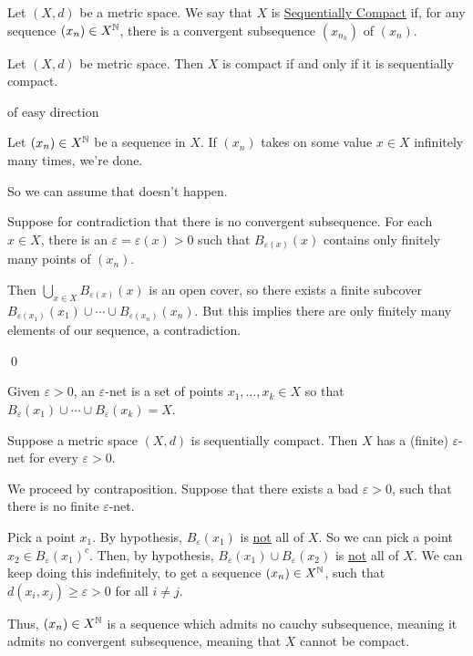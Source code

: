 \documentclass[x11names,reqno,14pt]{extarticle}
\begin{document}

Let $(X, d)$ be a metric space. We say that $X$ is \underline{Sequentially Compact} if, for any sequence $(x_n) \in X^{\mathbb{N}}$, there is a convergent subsequence $(x_{n_k})$ of $(x_n)$. 

\thm 

Let $(X, d)$ be metric space. Then $X$ is compact if and only if it is sequentially compact. 

\proof of easy direction

Let $(x_n) \in X^{\mathbb{N}}$ be a sequence in $X$. If $(x_n)$ takes on some value $x \in X$ infinitely many times, we're done. 

So we can assume that doesn't happen. 

Suppose for contradiction that there is no convergent subsequence. For each $x \in X$, there is an $\varepsilon = \varepsilon(x) > 0$ such that $B_{\varepsilon(x)}(x)$ contains only finitely many points of $(x_n)$. 

Then $\bigcup_{x\in X}B_{\varepsilon(x)}(x)$ is an open cover, so there exists a finite subcover $B_{\varepsilon(x_1)}(x_1) \cup \cdots \cup B_{\varepsilon(x_n)}(x_n)$. But this implies there are only finitely many elements of our sequence, a contradiction. 

\qed


Given $\varepsilon>0$, an $\varepsilon$-net is a set of points $x_1, \dots, x_k \in X$ so that $B_{\varepsilon}(x_1) \cup \cdots \cup B_{\varepsilon}(x_k) = X$. 

\thm 

Suppose a metric space $(X, d)$ is sequentially compact. Then $X$ has a (finite) $\varepsilon$-net for every $\varepsilon > 0$. 

\proof

We proceed by contraposition. Suppose that there exists a bad $\varepsilon>0$, such that there is no finite $\varepsilon$-net. 

Pick a point $x_1$. By hypothesis, $B_{\varepsilon}(x_1)$ is \underline{not} all of $X$. So we can pick a point $x_2 \in B_\varepsilon(x_1)^c$. Then, by hypothesis, $B_\varepsilon(x_1) \cup B_\varepsilon(x_2)$ is \underline{not} all of $X$. We can keep doing this indefinitely, to get a sequence $(x_n) \in X^{\mathbb{N}}$, such that $d(x_i, x_j) \geq \varepsilon > 0$ for all $i \neq j$. 

Thus, $(x_n) \in X^{\mathbb{N}}$ is a sequence which admits no cauchy subsequence, meaning it admits no convergent subsequence, meaning that $X$ cannot be compact.
\end{document}
